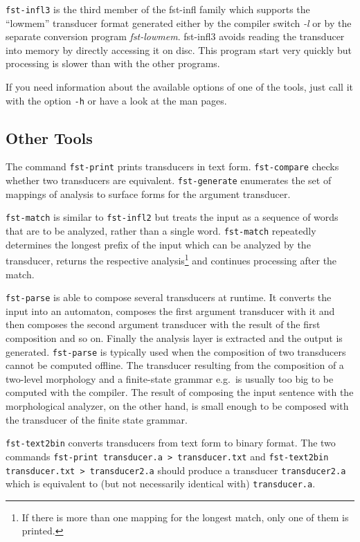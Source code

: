 \documentclass{article}
\begin{document}
\texttt{fst-infl3} is the third member of the fst-infl family which
supports the ``lowmem'' transducer format generated either by the
compiler switch \emph{-l} or by the separate conversion program
\emph{fst-lowmem}. fst-infl3 avoids reading the transducer into memory
by directly accessing it on disc. This program start very quickly but
processing is slower than with the other programs.

If you need information about the available options of one of the
tools, just call it with the option \texttt{-h} or have a look at the
man pages. 


\subsection{Other Tools}

The command \texttt{fst-print} prints transducers in text form.
\texttt{fst-compare} checks whether two transducers are equivalent.
\texttt{fst-generate} enumerates the set of mappings of analysis to
surface forms for the argument transducer.

\texttt{fst-match} is similar to \texttt{fst-infl2} but treats the
input as a sequence of words that are to be analyzed, rather than a
single word. \texttt{fst-match} repeatedly determines the longest
prefix of the input which can be analyzed by the transducer, returns
the respective analysis\footnote{If there is more than one mapping for
  the longest match, only one of them is printed.} and continues
processing after the match.

\texttt{fst-parse} is able to compose several transducers at runtime.
It converts the input into an automaton, composes the first argument
transducer with it and then composes the second argument transducer
with the result of the first composition and so on. Finally the
analysis layer is extracted and the output is generated.
\texttt{fst-parse} is typically used when the composition of two
transducers cannot be computed offline. The transducer resulting from
the composition of a two-level morphology and a finite-state grammar
e.g.\ is usually too big to be computed with the compiler. The result
of composing the input sentence with the morphological analyzer, on
the other hand, is small enough to be composed with the transducer of
the finite state grammar.

\texttt{fst-text2bin} converts transducers from text form to binary
format. The two commands \texttt{fst-print transducer.a >
  transducer.txt} and \texttt{fst-text2bin transducer.txt >
  transducer2.a} should produce a transducer \texttt{transducer2.a}
which is equivalent to (but not necessarily identical with)
\texttt{transducer.a}.
\end{document}
